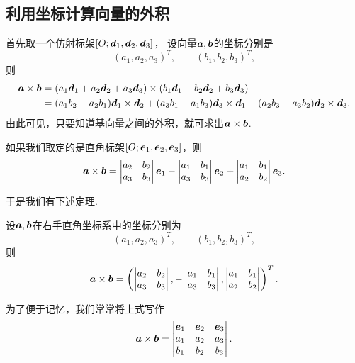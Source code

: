 \subsection{利用坐标计算向量的外积}
首先取一个仿射标架\([O;\boldsymbol{d}_1,\boldsymbol{d}_2,\boldsymbol{d}_3]\)，
设向量\(\boldsymbol{a},\boldsymbol{b}\)的坐标分别是\[
	(a_1,a_2,a_3)^T, \qquad
	(b_1,b_2,b_3)^T,
\]
则\begin{equation}
\begin{split}
	\boldsymbol{a}\times\boldsymbol{b}
	&= (a_1 \boldsymbol{d}_1 + a_2 \boldsymbol{d}_2 + a_3 \boldsymbol{d}_3)
	\times (b_1 \boldsymbol{d}_1 + b_2 \boldsymbol{d}_2 + b_3 \boldsymbol{d}_3) \\
	&= (a_1 b_2 - a_2 b_1) \boldsymbol{d}_1 \times \boldsymbol{d}_2
	+ (a_3 b_1 - a_1 b_3) \boldsymbol{d}_3 \times \boldsymbol{d}_1
	+ (a_2 b_3 - a_3 b_2) \boldsymbol{d}_2 \times \boldsymbol{d}_3.
\end{split}
\end{equation}
由此可见，只要知道基向量之间的外积，就可求出\(\boldsymbol{a}\times\boldsymbol{b}\).

如果我们取定的是直角标架\([O;\boldsymbol{e}_1,\boldsymbol{e}_2,\boldsymbol{e}_3]\)，则
\begin{equation}
	\boldsymbol{a}\times\boldsymbol{b}
	= \begin{vmatrix}
		a_2 & b_2 \\
		a_3 & b_3
	\end{vmatrix}
	\boldsymbol{e}_1
	- \begin{vmatrix}
		a_1 & b_1 \\
		a_3 & b_3
	\end{vmatrix}
	\boldsymbol{e}_2
	+ \begin{vmatrix}
		a_1 & b_1 \\
		a_2 & b_2
	\end{vmatrix}
	\boldsymbol{e}_3.
\end{equation}

于是我们有下述定理.
\begin{theorem}
设\(\boldsymbol{a},\boldsymbol{b}\)在右手直角坐标系中的坐标分别为\[
	(a_1,a_2,a_3)^T, \qquad
	(b_1,b_2,b_3)^T,
\]
则
\begin{equation}
	\boldsymbol{a}\times\boldsymbol{b}
	= \left( \begin{vmatrix}
		a_2 & b_2 \\
		a_3 & b_3
	\end{vmatrix},
	- \begin{vmatrix}
		a_1 & b_1 \\
		a_3 & b_3
	\end{vmatrix},
	\begin{vmatrix}
		a_1 & b_1 \\
		a_2 & b_2
	\end{vmatrix} \right)^T.
\end{equation}
\end{theorem}
为了便于记忆，我们常常将上式写作\begin{equation}
	\boldsymbol{a}\times\boldsymbol{b}
	= \begin{vmatrix}
		\boldsymbol{e}_1 & \boldsymbol{e}_2 & \boldsymbol{e}_3 \\
		a_1 & a_2 & a_3 \\
		b_1 & b_2 & b_3
	\end{vmatrix}.
\end{equation}


